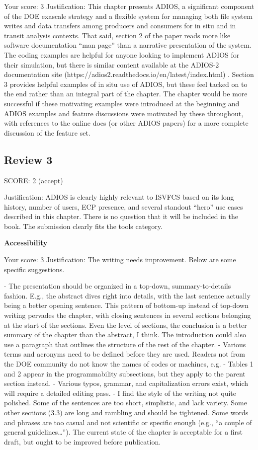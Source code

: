 Your score: 3
Justification: This chapter presents ADIOS, a significant component of the DOE exascale strategy and a flexible system for managing both file system writes and data transfers among producers and consumers for in situ and in transit analysis contexts. That said, section 2 of the paper reads more like software documentation “man page” than a narrative presentation of the system. The coding examples are helpful for anyone looking to implement ADIOS for their simulation, but there is similar content available at the ADIOS-2 documentation site (https://adios2.readthedocs.io/en/latest/index.html) . Section 3 provides helpful examples of in situ use of ADIOS, but these feel tacked on to the end rather than an integral part of the chapter. The chapter would be more successful if these motivating examples were introduced at the beginning and ADIOS examples and feature discussions were motivated by these throughout, with references to the online docs (or other ADIOS papers) for a
more complete discussion of the feature set.


\subsection{Review 3}
SCORE: 2 (accept)

Justification: ADIOS is clearly highly relevant to ISVFCS based on its long history, number of users, ECP presence, and several standout “hero” use cases described in this chapter. There is no question that it will be included in the book. The submission clearly fits the tools category.

\noindent\textbf{Accessibility}

Your score: 3
Justification: The writing needs improvement. Below are some specific suggestions.

- The presentation should be organized in a top-down, summary-to-details fashion. E.g., the abstract dives right into details, with the last sentence actually being a better opening sentence. This pattern of bottom-up instead of top-down writing pervades the chapter, with closing sentences in several sections belonging at the start of the sections. Even the level of sections, the conclusion is a better summary of the chapter than the abstract, I think. The introduction could also use a paragraph that outlines the structure of the rest of the chapter.
- Various terms and acronyms need to be defined before they are used. Readers not from the DOE community do not know the names of codes or machines, e.g.
- Tables 1 and 2 appear in the programmability subsections, but they apply to the parent section instead.
- Various typos, grammar, and capitalization errors exist, which will require a detailed editing pass.
- I find the style of the writing not quite polished. Some of the sentences are too short, simplistic, and lack variety. Some other sections (3.3) are long and rambling and should be tightened. Some words and phrases are too casual and not scientific or specific enough (e.g., “a couple of general guidelines…”). The current state of the chapter  is acceptable for a first draft, but ought to be improved before publication.

